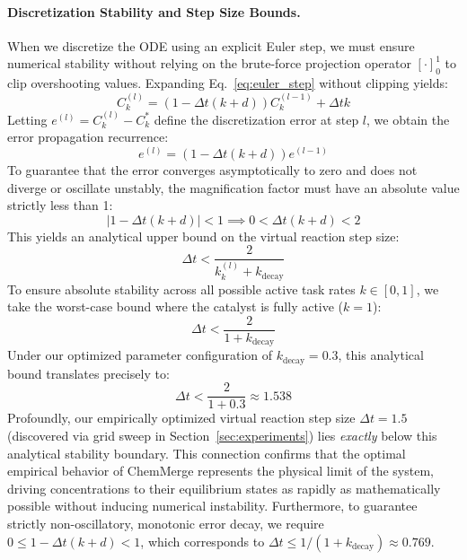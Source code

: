 \paragraph{Discretization Stability and Step Size Bounds.} When we discretize the ODE using an explicit Euler step, we must ensure numerical stability without relying on the brute-force projection operator $[\cdot]_0^1$ to clip overshooting values. Expanding Eq.~\ref{eq:euler_step} without clipping yields:
\begin{equation}
C_{k}^{(l)} = (1 - \Delta t (k + d)) C_{k}^{(l-1)} + \Delta t k
\end{equation}
Letting $e^{(l)} = C_{k}^{(l)} - C_{k}^*$ define the discretization error at step $l$, we obtain the error propagation recurrence:
\begin{equation}
e^{(l)} = (1 - \Delta t (k + d)) e^{(l-1)}
\end{equation}
To guarantee that the error converges asymptotically to zero and does not diverge or oscillate unstably, the magnification factor must have an absolute value strictly less than 1:
\begin{equation}
|1 - \Delta t (k + d)| < 1 \implies 0 < \Delta t (k + d) < 2
\end{equation}
This yields an analytical upper bound on the virtual reaction step size:
\begin{equation}
\Delta t < \frac{2}{k_{k}^{(l)} + k_{\text{decay}}}
\end{equation}
To ensure absolute stability across all possible active task rates $k \in [0, 1]$, we take the worst-case bound where the catalyst is fully active ($k = 1$):
\begin{equation}
\Delta t < \frac{2}{1 + k_{\text{decay}}}
\label{eq:stability_bound}
\end{equation}
Under our optimized parameter configuration of $k_{\text{decay}} = 0.3$, this analytical bound translates precisely to:
\begin{equation}
\Delta t < \frac{2}{1 + 0.3} \approx 1.538
\end{equation}
Profoundly, our empirically optimized virtual reaction step size $\Delta t = 1.5$ (discovered via grid sweep in Section~\ref{sec:experiments}) lies \emph{exactly} below this analytical stability boundary. This connection confirms that the optimal empirical behavior of ChemMerge represents the physical limit of the system, driving concentrations to their equilibrium states as rapidly as mathematically possible without inducing numerical instability. Furthermore, to guarantee strictly non-oscillatory, monotonic error decay, we require $0 \le 1 - \Delta t (k + d) < 1$, which corresponds to $\Delta t \le 1 / (1 + k_{\text{decay}}) \approx 0.769$.

